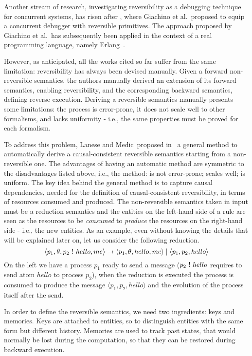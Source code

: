 \documentclass{article}[12pt,a4paper]
\theoremstyle{definition}
\newcommand{\paral}{\;|\;}
\begin{document}
Another stream of research, investigating reversibility as a debugging technique for concurrent systems,
has risen after \cite{GiachinoLM14}, where Giachino et al.~proposed to
equip a concurrent debugger with reversible primitives.
The approach proposed by Giachino et al.~has subsequently been applied in the context of a real programming language, namely Erlang~\cite{LaneseNPV18,Lanese0PV18,Gonzalez-AbrilV21,FabbrettiLS21}.

However, as anticipated, all the works cited so far suffer from the same limitation: reversibility has always been
devised manually. Given a forward non-reversible semantics, the authors manually
derived an extension of its forward semantics, enabling reversibility, and the corresponding backward semantics, defining reverse execution.
Deriving a reversible semantics manually presents some limitations: the
process is error-prone, it does not scale well to other formalisms, and lacks
uniformity - i.e., the same properties must be proved for each formalism.

To address this problem, Lanese and Medic~proposed in~\cite{LaneseM20} a
general method to
automatically derive a causal-consistent reversible semantics starting from a non-reversible one. The
advantages of having an automatic method are symmetric to the disadvantages
listed above, i.e., the method: is not error-prone; scales well; is uniform. The key idea behind the general method is to capture
causal dependencies, needed for the definition of causal-consistent reversibility, in terms of resources consumed and produced. The non-reversible
semantics taken in input must be a reduction semantics and the entities on the
left-hand side of a rule are seen as the resources to be \emph{consumed} to
\emph{produce} the resources on the right-hand side - i.e., the new entities.
As an example, even without knowing the details that will be explained later on, let
us consider the following reduction. 
\begin{equation}\label{samplerule}
\langle p_1, \theta, p_2~\ms{!}~hello, me\rangle \rightarrow \langle p_1, \theta,
hello, me\rangle \paral\langle p_1, p_2,hello \rangle
\end{equation}
On the left we have a process $p_1$ ready to send a
message ($p_2~\mathsf{!}~hello$ requires to send atom $hello$ to process $p_2$), when the reduction is executed the process is consumed to produce the message
$\langle p_1, p_2,hello \rangle$ and the evolution of the process itself after the send.

In order to define the reversible semantics, we need two ingredients: keys and memories.
Keys are attached to entities, so to distinguish entities with the same form but different history.
Memories are used to track past states, that would normally be lost during the computation, so that
they can be restored during backward execution.
\end{document}
